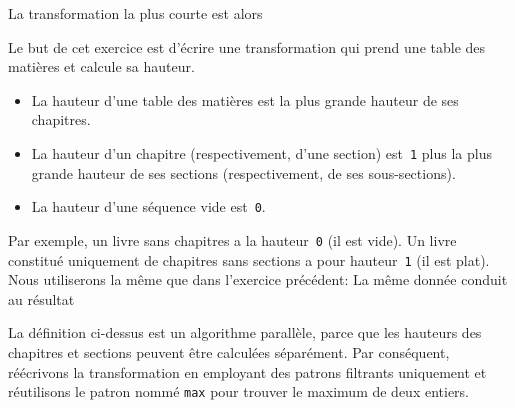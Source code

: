 La transformation la plus courte est alors


Le but de cet exercice est d'écrire une transformation \XSLT qui prend
une table des matières et calcule sa hauteur.
\begin{itemize}

  \item La hauteur d'une table des matières est la plus grande hauteur
  de ses chapitres.

  \item La hauteur d'un chapitre (respectivement, d'une section)
    est~\texttt{1} plus la plus grande hauteur de ses sections
    (respectivement, de ses sous-sections).

  \item La hauteur d'une séquence vide est~\texttt{0}.

\end{itemize}

\bigskip

Par exemple, un livre sans chapitres a la hauteur~\texttt{0} (il est
vide). Un livre constitué uniquement de chapitres sans sections a pour
hauteur~\texttt{1} (il est plat). Nous utiliserons la même \DTD que
dans l'exercice précédent:
\noindent La même donnée
\noindent conduit au résultat
{\small}

La définition ci-dessus est un algorithme parallèle, parce que les
hauteurs des chapitres et sections peuvent être calculées
séparément. Par conséquent, réécrivons la transformation en employant
des patrons filtrants uniquement et réutilisons le patron nommé
\texttt{max} pour trouver le maximum de deux entiers.

